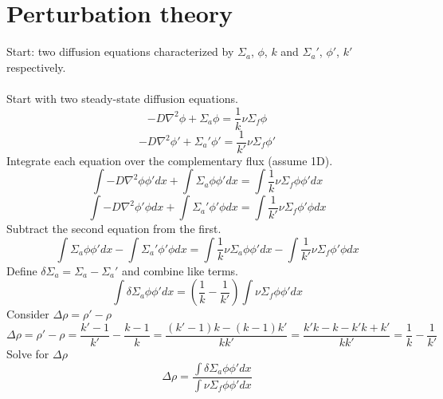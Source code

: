 \documentclass[]{article}
\begin{document}
		\section*{\textbf{Perturbation theory}} Start: two diffusion equations characterized by $\Sigma_a$, $\phi$, $k$ and $\Sigma_a'$, $\phi'$, $k'$ respectively.\\\\
		Start with two steady-state diffusion equations.
		\[
		-D\nabla^2\phi+\Sigma_a\phi = \frac{1}{k}\nu\Sigma_f\phi
		\]
		\[
		-D\nabla^2\phi'+\Sigma_a'\phi' = \frac{1}{k'}\nu\Sigma_f\phi'
		\]
		Integrate each equation over the complementary flux (assume 1D).
		\[
		\int-D\nabla^2\phi\phi' dx+\int\Sigma_a\phi\phi' dx = \int\frac{1}{k}\nu\Sigma_f\phi\phi' dx
		\]
		\[
		\int-D\nabla^2\phi'\phi dx+\int\Sigma_a'\phi'\phi dx = \int\frac{1}{k'}\nu\Sigma_f\phi'\phi dx
		\]
		Subtract the second equation from the first.
		\[
		\int\Sigma_a\phi\phi' dx -\int\Sigma_a'\phi'\phi dx = \int\frac{1}{k}\nu\Sigma_a\phi\phi' dx-\int\frac{1}{k'}\nu\Sigma_f\phi'\phi dx
		\]
		Define $\delta\Sigma_a = \Sigma_a - \Sigma_a'$ and combine like terms.
		\[
		\int\delta\Sigma_a\phi\phi' dx = \left(\frac{1}{k}-\frac{1}{k'}\right)\int\nu\Sigma_f\phi\phi' dx
		\]
		Consider $\Delta\rho=\rho'-\rho$
		\[
		\Delta\rho=\rho'-\rho=\frac{k'-1}{k'}-\frac{k-1}{k}=\frac{(k'-1)k-(k-1)k'}{kk'}=\frac{k'k-k-k'k+k'}{kk'} = \frac{1}{k}-\frac{1}{k'}
		\]
		Solve for $\Delta\rho$
		\[
		\Delta\rho=\frac{\int\delta\Sigma_a\phi\phi' dx}{\int\nu\Sigma_f\phi\phi' dx}
		\]
		
		
\end{document}
